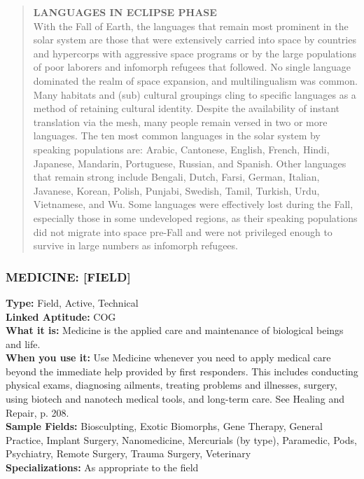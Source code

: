 \begin{quotation}
\textbf{LANGUAGES IN ECLIPSE PHASE}
\\
With the Fall of Earth, the languages that
remain most prominent in the solar system are
those that were extensively carried into space
by countries and hypercorps with aggressive
space programs or by the large populations
of poor laborers and infomorph refugees that
followed. No single language dominated the
realm of space expansion, and multilingualism was common. Many habitats and (sub)
cultural groupings cling to specific languages
as a method of retaining cultural identity. Despite the availability of instant translation via
the mesh, many people remain versed in two or
more languages.
The ten most common languages in the solar
system by speaking populations are: Arabic,
Cantonese, English, French, Hindi, Japanese,
Mandarin, Portuguese, Russian, and Spanish.
Other languages that remain strong include
Bengali, Dutch, Farsi, German, Italian, Javanese,
Korean, Polish, Punjabi, Swedish, Tamil, Turkish,
Urdu, Vietnamese, and Wu. Some languages
were effectively lost during the Fall, especially
those in some undeveloped regions, as their
speaking populations did not migrate into space
pre-Fall and were not privileged enough to survive in large numbers as infomorph refugees.
\end{quotation}


\subsubsection{MEDICINE: [FIELD]}
\textbf{Type:} Field, Active, Technical
\\ \textbf{Linked Aptitude:} COG
\\ \textbf{What it is:} Medicine is the applied care and maintenance of biological beings and life.
\\ \textbf{When you use it:} Use Medicine whenever you need
to apply medical care beyond the immediate help
provided by first responders. This includes conducting physical exams, diagnosing ailments, treating
problems and illnesses, surgery, using biotech and
nanotech medical tools, and long-term care. See Healing and Repair, p. 208.
\\ \textbf{Sample Fields:} Biosculpting, Exotic Biomorphs,
Gene Therapy, General Practice, Implant Surgery,
Nanomedicine, Mercurials (by type), Paramedic,
Pods, Psychiatry, Remote Surgery, Trauma Surgery,
Veterinary
\\ \textbf{Specializations:} As appropriate to the field

